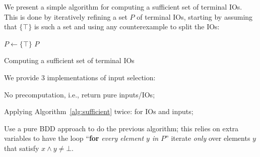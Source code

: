 \documentclass[runningheads,a4paper]{llncs}
\begin{document}
%
%
%
We present a simple algorithm for computing a sufficient set of terminal
IOs.  This is done by iteratively refining a set \(P\) of terminal IOs, starting
by assuming that \(\{\top\}\) is such a set and using any counterexample to split the
IOs:

\begin{algorithm}[H]

\BlankLine
\(P \leftarrow \{\top\}\)\;
\Return \(P\)
\caption{Computing a sufficient set of terminal IOs}
\label{alg:sufficient}
\end{algorithm}
\noindent We provide 3 implementations of input selection:
\begin{compactitem}
\item No precomputation, i.e., return pure inputs/IOs;
\item Applying Algorithm~\ref{alg:sufficient} twice: for IOs and inputs;
\item Use a pure BDD approach to do the previous algorithm; this relies on extra
  variables to have the loop ``\textbf{for}\emph{ every element \(y\) in \(P\)}''
  iterate \emph{only} over elements \(y\) that satisfy \(x \land y \neq \bot\).
\end{compactitem}
\end{document}
